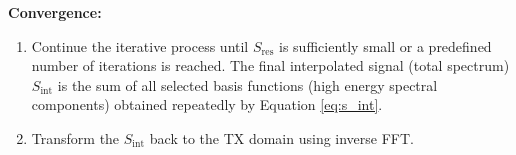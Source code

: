 \noindent\textbf{Convergence:} 
\begin{enumerate}
	\item Continue the iterative process until $S_{\text{res}}$ is sufficiently small or a predefined number of iterations is reached. The final interpolated signal (total spectrum) $S_{\text{int}}$ is the sum of all selected basis functions (high energy spectral components) obtained repeatedly by Equation \ref{eq:s_int}.
	\item Transform the $S_{\text{int}}$ back to the TX domain using inverse FFT.
\end{enumerate}

